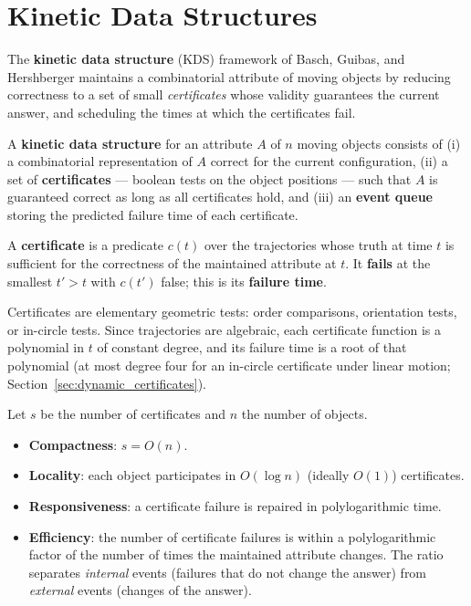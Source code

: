 \section{Kinetic Data Structures}
\label{sec:dynamic_kds}

The \textbf{kinetic data structure} (KDS)
framework of Basch, Guibas, and Hershberger \cite{basch1999,guibas1998}
maintains a combinatorial attribute of moving objects by reducing correctness
to a set of small \emph{certificates} whose validity guarantees the current
answer, and scheduling the times at which the certificates fail.

\begin{definition}\label{def:kinetic_structure}
  A \textbf{kinetic data structure} for an attribute $A$ of $n$ moving
  objects consists of (i) a combinatorial representation of $A$ correct for
  the current configuration, (ii) a set of \textbf{certificates} --- boolean
  tests on the object positions --- such that $A$ is guaranteed correct as
  long as all certificates hold, and (iii) an \textbf{event queue} storing
  the predicted failure time of each certificate.
\end{definition}

\begin{definition}[Certificate]\label{def:kinetic_certificate}
  A \textbf{certificate} is a predicate $c(t)$ over the trajectories whose
  truth at time $t$ is sufficient for the correctness of the maintained
  attribute at $t$. It \textbf{fails} at the smallest $t' > t$ with $c(t')$
  false; this is its \textbf{failure time}.
\end{definition}

Certificates are elementary geometric tests: order comparisons,
orientation tests, or in-circle tests. Since trajectories are algebraic,
each certificate function is a polynomial in $t$ of constant degree, and its
failure time is a root of that polynomial (at most degree four for an
in-circle certificate under linear motion; Section~\ref{sec:dynamic_certificates}).
\begin{definition}\label{def:kinetic_properties}
  Let $s$ be the number of certificates and $n$ the number of objects.
  \begin{itemize}
    \item \textbf{Compactness}: $s = O(n)$.
    \item \textbf{Locality}: each object participates in
      $O(\log n)$ (ideally $O(1)$) certificates.
    \item \textbf{Responsiveness}: a certificate failure is repaired in
      polylogarithmic time.
    \item \textbf{Efficiency}: the number of certificate failures is within
      a polylogarithmic factor of the number of times the maintained
      attribute changes. The ratio separates \emph{internal} events
      (failures that do not change the answer) from \emph{external} events
      (changes of the answer).
  \end{itemize}
\end{definition}

